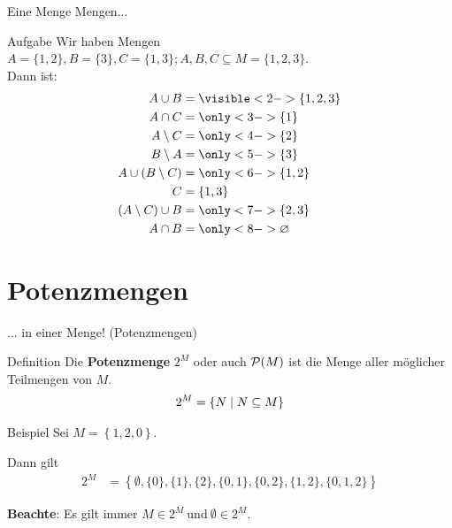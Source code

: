 \begin{frame}{Eine Menge Mengen...}
	\begin{block}{Aufgabe}
		Wir haben Mengen $A = \{1, 2\}, B = \{3\}, C = \{1, 3\}; A,B,C \subseteq M = \{1, 2, 3\}$.\\
		Dann ist:
		\begin{align*}
		A \cup B &= \visible<2->{ \{1, 2, 3\} }  \\
		A \cap C &= \only<3->{ \{1\} }\\
		A \setminus C &= \only<4->{ \{2\} }\\
		B \setminus A &= \only<5->{ \{3\} }\\
		A \cup (B \setminus C) &= \only<6->{ \{1, 2\} }\\
		C &= \{1, 3\} \\
		(A \setminus C) \cup B &= \only<7->{ \{2, 3\} }\\
		A \cap B &= \only<8->{ \emptyset }
		\end{align*}
	\end{block}
\end{frame}



\section{Potenzmengen}

\begin{frame}{... in einer Menge! (Potenzmengen)}
	\begin{block}{Definition}
		Die \textbf{Potenzmenge} $2^M$ oder auch $\mathcal{P} (M)$ ist die Menge aller möglicher Teilmengen von $M$. 
		\begin{align*}
			2^M = \left\{ N \;\middle|\;  N \subseteq M \right\}
		\end{align*}
	\end{block}
	\pause
	
	\begin{block}{Beispiel}
		Sei $M = \left\{ 1,2,0 \right\} $. \\ \pause
		
		Dann gilt  
		\begin{align*}   
		2^M &= \left\{ \emptyset, \{ 0 \}, \{ 1 \}, \{ 2 \}, \{ 0,1 \} , \{ 0,2 \}, \{ 1,2 \}, \{ 0,1,2 \} \right\}
		\end{align*}
		
		\textbf{Beachte}: Es gilt immer $M \in 2^M \ \text{und} \ \emptyset \in 2^M$.
	\end{block}
	
\end{frame}

